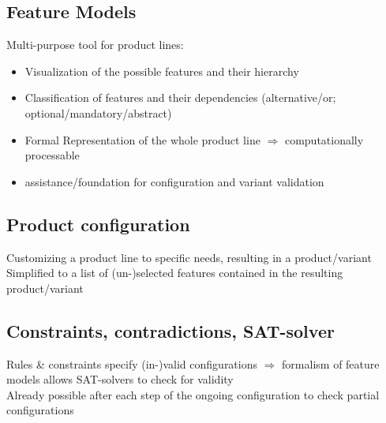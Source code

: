 \subsection{Feature Models}
Multi-purpose tool for product lines:
\begin{itemize}
\item Visualization of the possible features and their hierarchy
\item Classification of features and their dependencies (alternative/or; optional/mandatory/abstract)
\item Formal Representation of the whole product line $\Rightarrow$ computationally processable
\item assistance/foundation for configuration and variant validation
\end{itemize}

\subsection{Product configuration}
Customizing a product line to specific needs, resulting in a product/variant\\
Simplified to a list of (un-)selected features contained in the resulting product/variant\\

\subsection{Constraints, contradictions, SAT-solver}
Rules \& constraints specify (in-)valid configurations $\Rightarrow$ formalism of feature models allows SAT-solvers to check for validity\\
Already possible after each step of the ongoing configuration to check partial configurations